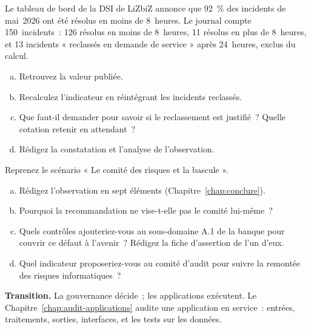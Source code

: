 \begin{boxexo}[title={\ding{45}\quad Exercice~13.2. Recalculer un délai de résolution \niveaumoyen}]
Le tableau de bord de la DSI de LiZbiZ annonce que 92~\% des incidents de
mai~2026 ont été résolus en moins de 8~heures. Le journal compte
150~incidents~: 126 résolus en moins de 8~heures, 11 résolus en plus de
8~heures, et 13 incidents « reclassés en demande de service » après
24~heures, exclus du calcul.
\begin{enumerate}[(a)]
    \item Retrouvez la valeur publiée.
    \item Recalculez l'indicateur en réintégrant les incidents reclassés.
    \item Que faut-il demander pour savoir si le reclassement est justifié~?
          Quelle cotation retenir en attendant~?
    \item Rédigez la constatation et l'analyse de l'observation.
\end{enumerate}
\end{boxexo}

\begin{boxexo}[title={\ding{45}\quad Exercice~13.3. Le comité des risques de la BANQUE SANAGA \niveauexpert}]
Reprenez le scénario « Le comité des risques et la bascule ».
\begin{enumerate}[(a)]
    \item Rédigez l'observation en sept éléments (Chapitre~\ref{chap:conclure}).
    \item Pourquoi la recommandation ne vise-t-elle pas le comité
          lui-même~?
    \item Quels contrôles ajouteriez-vous au sous-domaine A.1 de la banque
          pour couvrir ce défaut à l'avenir~? Rédigez la fiche d'assertion
          de l'un d'eux.
    \item Quel indicateur proposeriez-vous au comité d'audit pour suivre la
          remontée des risques informatiques~?
\end{enumerate}
\end{boxexo}

\bigskip

\begin{boxinfo}
\textbf{Transition.} La gouvernance décide~; les applications exécutent.
Le Chapitre~\ref{chap:audit-applications} audite une application en
service~: entrées, traitements, sorties, interfaces, et les tests sur les
données.
\end{boxinfo}
